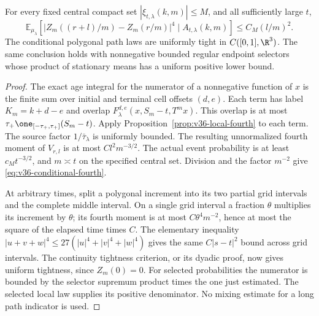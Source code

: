 \begin{corollary}
\label{cor:v36-conditional-tightness}
For every fixed central compact set $|\xi_{t,\lambda}(k,m)|\le M$,
and all sufficiently large $t$,
\begin{equation}\label{eq:v36-conditional-fourth}
 \mathbb E_{\mu_\lambda}\left[
  |Z_m((r+l)/m)-Z_m(r/m)|^4\mid A_{t,\lambda}(k,m)\right]
                           \le C_M(l/m)^2.
\end{equation}
The conditional polygonal path laws are uniformly tight in
$C([0,1],\R^3)$. The same conclusion holds with nonnegative bounded
regular endpoint selectors whose product of stationary means has a
uniform positive lower bound.
\end{corollary}
\begin{proof}
The exact age integral for the numerator of a nonnegative function of
$x$ is the finite sum over initial and terminal cell offsets $(d,e)$.
Each term has label $K_m=k+d-e$ and overlap
$F_\lambda^{d,e}(x,S_m-t,T^mx)$. This overlap is at most
$\tau_+\one_{[-\tau_+,\tau_+]}(S_m-t)$. Apply
Proposition~\ref{prop:v36-local-fourth} to each term. The source
factor $1/\bar\tau_\lambda$ is uniformly bounded. The resulting
unnormalized fourth moment of $V_{r,l}$ is at most
$Cl^2m^{-3/2}$. The actual event probability is at least
$c_Mt^{-3/2}$, and $m\asymp t$ on the specified central set.
Division and the factor $m^{-2}$ give
\eqref{eq:v36-conditional-fourth}.

At arbitrary times, split a polygonal increment into its two partial
grid intervals and the complete middle interval. On a single grid
interval a fraction $\theta$ multiplies its increment by $\theta$;
its fourth moment is at most $C\theta^4m^{-2}$, hence at most the
square of the elapsed time times $C$. The elementary inequality
$|u+v+w|^4\le27(|u|^4+|v|^4+|w|^4)$ gives the same
$C|s-t|^2$ bound across grid intervals. The continuity tightness
criterion, or its dyadic proof, now gives uniform tightness, since
$Z_m(0)=0$. For selected probabilities the numerator is bounded by
the selector supremum product times the one just estimated. The
selected local law supplies its positive denominator. No mixing
estimate for a long path indicator is used.
\end{proof}
